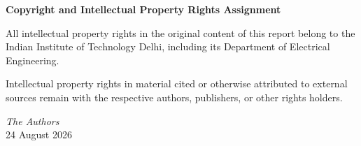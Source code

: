 \clearpage
\thispagestyle{ell305}
\vspace*{0.16\textheight}

\begin{center}
  {\Large\bfseries Copyright and Intellectual Property Rights Assignment\par}
\end{center}

\vspace{1.2cm}

All intellectual property rights in the original content of this report belong to the Indian Institute of Technology Delhi, including its Department of Electrical Engineering.

Intellectual property rights in material cited or otherwise attributed to external sources remain with the respective authors, publishers, or other rights holders.

\vfill

\begin{flushright}
  \textit{The Authors}\\
  24 August 2026
\end{flushright}
